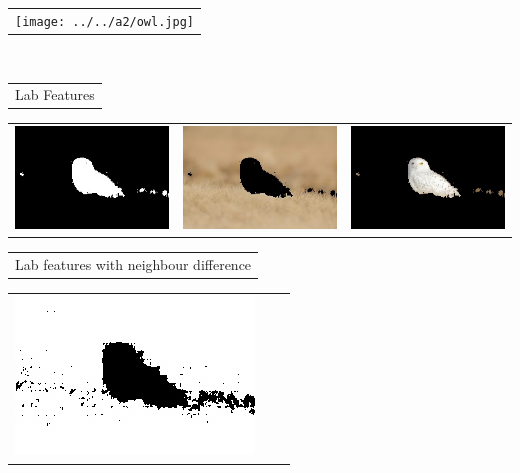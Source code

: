 \documentclass{article}
\begin{document}
\begin{center}
\begin{tabular}{c}
\texttt{[image: ../../a2/owl.jpg]}
\end{tabular}
\\
\begin{tabular}{c}

Lab Features \\
\end{tabular}
 \begin{tabular}{c c c} 

 \includegraphics[width=.4\linewidth]{../image-segmentation/output/Lab/owl_mask.jpg} & 
 
 \includegraphics[width=.4\linewidth]{../image-segmentation/output/Lab/owl_seg1.jpg} & \includegraphics[width=.4\linewidth]{../image-segmentation/output/Lab/owl_seg2.jpg} \\
  
 \end{tabular}
 \begin{tabular}{c}

Lab features with neighbour difference \\
\end{tabular}
 \begin{tabular}{c c c} 

 \includegraphics[width=.4\linewidth]{../image-segmentation/output/add-Lab-neighbor-diff-feature/owl_mask.jpg} & 
 

\end{tabular}
\end{center}
\end{document}
